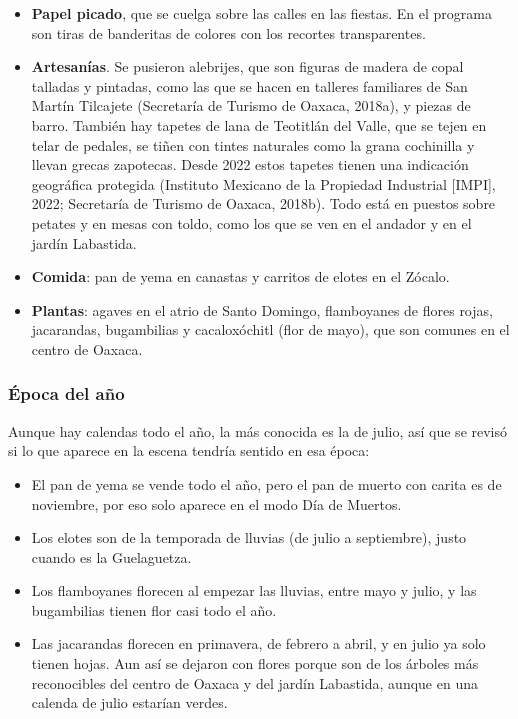 \documentclass[11pt,a4paper]{article}
\begin{document}
\begin{itemize}
  \item \textbf{Papel picado}, que se cuelga sobre las calles en las fiestas. En el programa son tiras de banderitas de colores con los recortes transparentes.
  \item \textbf{Artesanías}. Se pusieron alebrijes, que son figuras de madera de copal talladas y pintadas, como las que se hacen en talleres familiares de San Martín Tilcajete (Secretaría de Turismo de Oaxaca, 2018a), y piezas de barro. También hay tapetes de lana de Teotitlán del Valle, que se tejen en telar de pedales, se tiñen con tintes naturales como la grana cochinilla y llevan grecas zapotecas. Desde 2022 estos tapetes tienen una indicación geográfica protegida (Instituto Mexicano de la Propiedad Industrial [IMPI], 2022; Secretaría de Turismo de Oaxaca, 2018b). Todo está en puestos sobre petates y en mesas con toldo, como los que se ven en el andador y en el jardín Labastida.
  \item \textbf{Comida}: pan de yema en canastas y carritos de elotes en el Zócalo.
  \item \textbf{Plantas}: agaves en el atrio de Santo Domingo, flamboyanes de flores rojas, jacarandas, bugambilias y cacaloxóchitl (flor de mayo), que son comunes en el centro de Oaxaca.
\end{itemize}

\subsubsection{Época del año}

Aunque hay calendas todo el año, la más conocida es la de julio, así que se revisó si lo que aparece en la escena tendría sentido en esa época:

\begin{itemize}
  \item El pan de yema se vende todo el año, pero el pan de muerto con carita es de noviembre, por eso solo aparece en el modo Día de Muertos.
  \item Los elotes son de la temporada de lluvias (de julio a septiembre), justo cuando es la Guelaguetza.
  \item Los flamboyanes florecen al empezar las lluvias, entre mayo y julio, y las bugambilias tienen flor casi todo el año.
  \item Las jacarandas florecen en primavera, de febrero a abril, y en julio ya solo tienen hojas. Aun así se dejaron con flores porque son de los árboles más reconocibles del centro de Oaxaca y del jardín Labastida, aunque en una calenda de julio estarían verdes.
\end{itemize}
\end{document}
